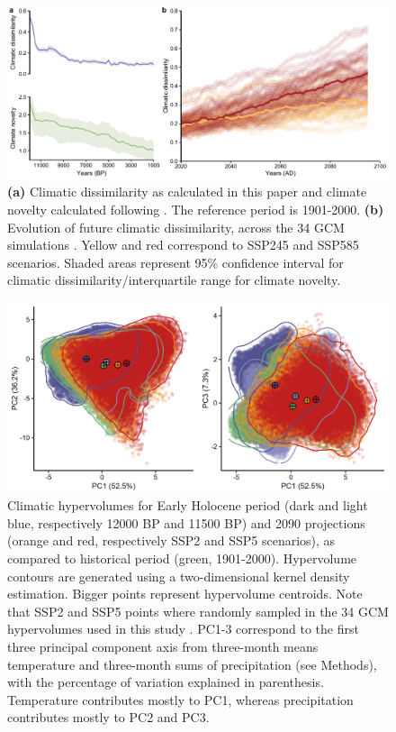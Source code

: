 \begin{figure}
\hspace*{-0.75in}
\centering
\includegraphics{chapter2/figs/supp/figS2_climatic_dissimilarity_novelty-1.pdf}
\caption{\textbf{(a)} Climatic dissimilarity as calculated in this paper and climate novelty calculated following \cite{Burke2019}. The reference period is 1901-2000. \textbf{(b)} Evolution of future climatic dissimilarity, across the 34 GCM simulations  \citep{Thrasher2022}. Yellow and red correspond to SSP245 and SSP585 scenarios. Shaded areas represent 95\% confidence interval for climatic dissimilarity/interquartile range for climate novelty.}
\label{fig:S2}
\end{figure}

\begin{figure}
\hspace*{-0.75in}
\centering
\includegraphics{chapter2/figs/supp/figS3_hypervolume_representation-1.png}
\caption{Climatic hypervolumes for Early Holocene period (dark and light blue, respectively 12000 BP and 11500 BP) and 2090 projections (orange and red, respectively SSP2 and SSP5 scenarios), as compared to historical period (green, 1901-2000). Hypervolume contours are generated using a two-dimensional kernel density estimation. Bigger points represent hypervolume centroids. Note that SSP2 and SSP5 points where randomly sampled in the 34 GCM hypervolumes used in this study  \cite{Thrasher2022}. PC1-3 correspond to the first three principal component axis from three-month means temperature and three-month sums of precipitation (see Methods), with the percentage of variation explained in parenthesis. Temperature contributes mostly to PC1, whereas precipitation contributes mostly to PC2 and PC3.}
\label{fig:S3}
\end{figure}

